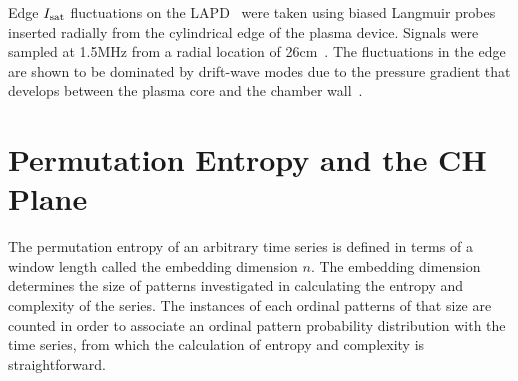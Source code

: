 \documentclass[aps,prx,twocolumn,secnumarabic,nobalancelastpage,amsmath,amssymb,
nofootinbib]{revtex4-1}
\begin{document}

Edge $I_{\rm sat}$ fluctuations on the LAPD~\cite{gekelman1991} were taken using biased Langmuir probes inserted radially from the cylindrical edge of the plasma device. Signals were sampled at 1.5MHz from a radial location of 26cm~\cite{schaffner2012}. The fluctuations in the edge are shown to be dominated by drift-wave modes due to the pressure gradient that develops between the plasma core and the chamber wall~\cite{maggs1996}.


\section{Permutation Entropy and the CH Plane}
The permutation entropy of an arbitrary time series is defined in terms of a window length called the embedding dimension $n$. The embedding dimension determines the size of patterns investigated in calculating the entropy and complexity of the series. The instances of each ordinal patterns of that size are counted in order to associate an ordinal pattern probability distribution with the time series, from which the calculation of entropy and complexity is straightforward.
\end{document}
